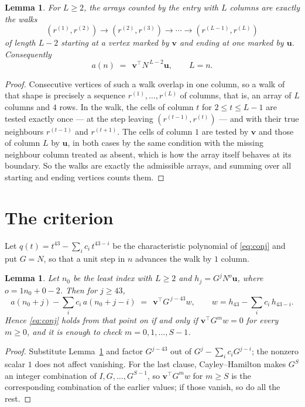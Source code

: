 \documentclass[11pt,a4paper]{article}
\theoremstyle{plain}
\newtheorem{lemma}[theorem]{Lemma}
\theoremstyle{definition}
\begin{document}
\begin{lemma}\label{lem:walk}
For $L\ge2$, the arrays counted by the entry with $L$ columns are exactly the walks
\[
(r^{(1)},r^{(2)})\to(r^{(2)},r^{(3)})\to\cdots\to(r^{(L-1)},r^{(L)})
\]
of length $L-2$ starting at a vertex marked by $\mathbf{v}$ and ending at one marked by
$\mathbf{u}$. Consequently
\[
a(n)\;=\;\,\mathbf{v}^{\!\top}N^{\,L-2}\mathbf{u},\qquad L=n .
\]
\end{lemma}

\begin{proof}
Consecutive vertices of such a walk overlap in one column, so a walk of that shape is
precisely a sequence $r^{(1)},\dots,r^{(L)}$ of columns, that is, an array of $L$ columns
and $4$ rows. In the walk, the cells of column $t$ for $2\le t\le L-1$ are tested
exactly once --- at the step leaving $(r^{(t-1)},r^{(t)})$ --- and with their true
neighbours $r^{(t-1)}$ and $r^{(t+1)}$. The cells of column $1$ are tested by
$\mathbf{v}$ and those of column $L$ by $\mathbf{u}$, in both cases by the same condition
with the missing neighbour column treated as absent, which is how the array itself behaves at
its boundary. So the walks are exactly the admissible arrays, and summing over all starting
and ending vertices counts them.
\end{proof}

\section{The criterion}

Let $q(t)=t^{43}-\sum_i c_i\,t^{43-i}$ be the characteristic polynomial of
\eqref{eq:conj} and put $G=N$, so that a unit step in $n$ advances the walk by
$1$ column.

\begin{lemma}\label{lem:crit}
Let $n_0$ be the least index with $L\ge2$ and $h_j=G^{j}N^{o}\mathbf{u}$, where
$o=1n_0+0-2$. Then for $j\ge43$,
\[
a(n_0+j)-\sum_i c_i\,a(n_0+j-i)\;=\;\,\mathbf{v}^{\!\top}G^{\,j-43}w,
\qquad w=h_{43}-\sum_i c_i\,h_{43-i} .
\]
Hence \eqref{eq:conj} holds from that point on if and only if
$\mathbf{v}^{\!\top}G^{m}w=0$ for every $m\ge0$, and it is enough to check
$m=0,1,\dots,S-1$.
\end{lemma}

\begin{proof}
Substitute Lemma~\ref{lem:walk} and factor $G^{j-43}$ out of
$G^{j}-\sum_ic_iG^{j-i}$; the nonzero scalar $1$ does not affect
vanishing. For the last clause, Cayley--Hamilton makes $G^{S}$ an integer combination of
$I,G,\dots,G^{S-1}$, so $\mathbf{v}^{\!\top}G^{m}w$ for $m\ge S$ is the corresponding
combination of the earlier values; if those vanish, so do all the rest.
\end{proof}
\end{document}
